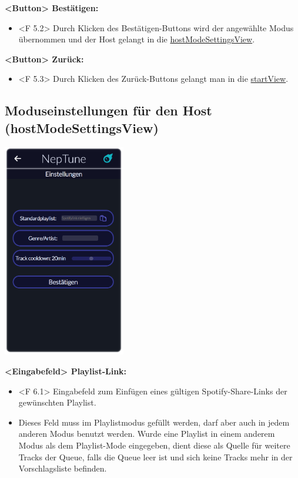 \documentclass[oneside, ngerman]{sdqtechreport}
\begin{document}
\textbf{<Button> Bestätigen:}
\begin{itemize}
    \item <F 5.2> Durch Klicken des Bestätigen-Buttons wird der angewählte Modus übernommen und der Host gelangt in die \hyperlink{hostModeSettingsView}{hostModeSettingsView}.
\end{itemize}

\textbf{<Button> Zurück:}
\begin{itemize}
    \item <F 5.3> Durch Klicken des Zurück-Buttons gelangt man in die  \hyperlink{startView}{startView}.
\end{itemize}



\subsection{Moduseinstellungen für den Host (hostModeSettingsView)}
\label{sec:Benutzeroberfläche:hostModeSettingsView}

\begin{center}
    \hypertarget{hostModeSettingsView}{}
    \includegraphics[width=0.4\textwidth]{LATEX/Pflichtenheft/GraphicDesigns/hostModusSettingsPage.png}
\end{center}

\textbf{<Eingabefeld> Playlist-Link:}
\begin{itemize}
    \item <F 6.1> Eingabefeld zum Einfügen eines gültigen Spotify-Share-Links der gewünschten Playlist.
    \item Dieses Feld muss im Playlistmodus gefüllt werden, darf aber auch in jedem anderen Modus benutzt werden. Wurde eine Playlist in einem anderem Modus als dem Playlist-Mode eingegeben, dient diese als Quelle für weitere Tracks der Queue, falls die Queue leer ist und sich keine Tracks mehr in der Vorschlagsliste befinden.
\end{itemize}
\end{document}
